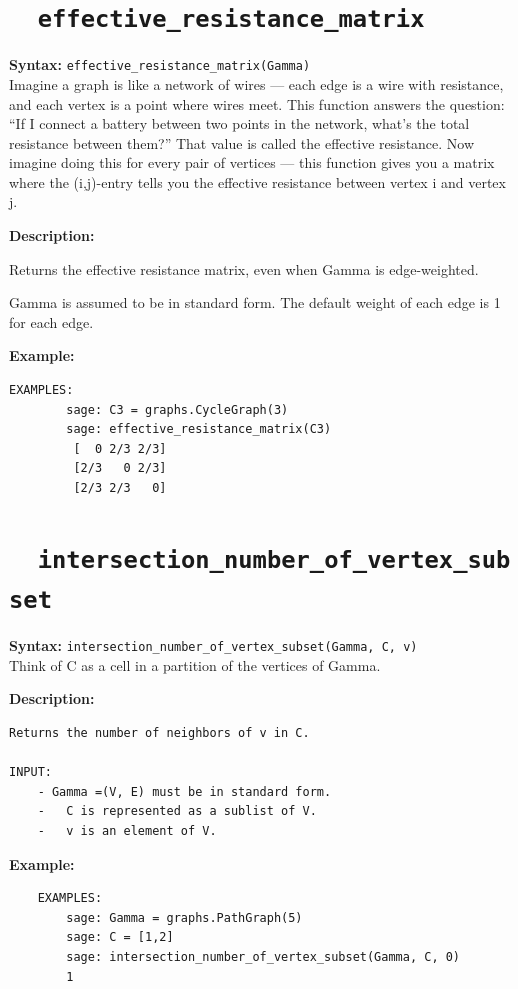 \documentclass{article}
\begin{document}
\section{\tt \ \ effective\_resistance\_matrix}

\textbf{Syntax:} \verb}effective_resistance_matrix(Gamma)}\\

Imagine a graph is like a network of wires — each edge is a wire with resistance,
and each vertex is a point where wires meet.
This function answers the question:
``If I connect a battery between two points in the network, what’s the total resistance between them?''
That value is called the effective resistance.
Now imagine doing this for every pair of vertices — this function gives you a matrix where the 
(i,j)-entry tells you the effective resistance between vertex i and vertex j.

\textbf{Description:}

Returns the effective resistance matrix, even when Gamma is
    edge-weighted.

    Gamma is assumed to be in standard form. The default weight of
    each edge is 1 for each edge.

\textbf{Example:}
\begin{verbatim}
EXAMPLES:
        sage: C3 = graphs.CycleGraph(3)
        sage: effective_resistance_matrix(C3) 
         [  0 2/3 2/3]
         [2/3   0 2/3]
         [2/3 2/3   0]
\end{verbatim}

\section{\tt \ \ intersection\_number\_of\_vertex\_subset}

\textbf{Syntax:} \verb}intersection_number_of_vertex_subset(Gamma, C, v)}\\

Think of C as a cell in a partition of the vertices of Gamma.

\textbf{Description:}
\begin{verbatim}
Returns the number of neighbors of v in C.

INPUT:
    - Gamma =(V, E) must be in standard form.
    -   C is represented as a sublist of V.
    -   v is an element of V.
\end{verbatim}

\textbf{Example:}
\begin{verbatim}
    EXAMPLES:
        sage: Gamma = graphs.PathGraph(5)
        sage: C = [1,2]
        sage: intersection_number_of_vertex_subset(Gamma, C, 0)
        1
\end{verbatim}
\end{document}
